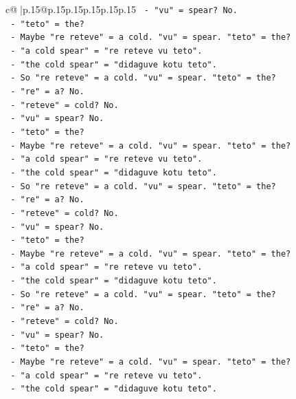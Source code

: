 \documentclass{article}
\begin{document}
{\begin{supertabular}{c@{$\;$}|p{.15\linewidth}@{}p{.15\linewidth}p{.15\linewidth}p{.15\linewidth}p{.15\linewidth}p{.15\linewidth}}
{{{\texttt{   {-} "vu" = spear? No.} \\
\texttt{   {-} "teto" = the?} \\
\texttt{   {-} Maybe "re reteve" = a cold. "vu" = spear. "teto" = the?} \\
\texttt{   {-} "a cold spear" = "re reteve vu teto".} \\
\texttt{   {-} "the cold spear" = "didaguve kotu teto".} \\
\texttt{   {-} So "re reteve" = a cold. "vu" = spear. "teto" = the?} \\
\texttt{   {-} "re" = a? No.} \\
\texttt{   {-} "reteve" = cold? No.} \\
\texttt{   {-} "vu" = spear? No.} \\
\texttt{   {-} "teto" = the?} \\
\texttt{   {-} Maybe "re reteve" = a cold. "vu" = spear. "teto" = the?} \\
\texttt{   {-} "a cold spear" = "re reteve vu teto".} \\
\texttt{   {-} "the cold spear" = "didaguve kotu teto".} \\
\texttt{   {-} So "re reteve" = a cold. "vu" = spear. "teto" = the?} \\
\texttt{   {-} "re" = a? No.} \\
\texttt{   {-} "reteve" = cold? No.} \\
\texttt{   {-} "vu" = spear? No.} \\
\texttt{   {-} "teto" = the?} \\
\texttt{   {-} Maybe "re reteve" = a cold. "vu" = spear. "teto" = the?} \\
\texttt{   {-} "a cold spear" = "re reteve vu teto".} \\
\texttt{   {-} "the cold spear" = "didaguve kotu teto".} \\
\texttt{   {-} So "re reteve" = a cold. "vu" = spear. "teto" = the?} \\
\texttt{   {-} "re" = a? No.} \\
\texttt{   {-} "reteve" = cold? No.} \\
\texttt{   {-} "vu" = spear? No.} \\
\texttt{   {-} "teto" = the?} \\
\texttt{   {-} Maybe "re reteve" = a cold. "vu" = spear. "teto" = the?} \\
\texttt{   {-} "a cold spear" = "re reteve vu teto".} \\
\texttt{   {-} "the cold spear" = "didaguve kotu teto".} \\
}}}
\end{supertabular}}
\end{document}
